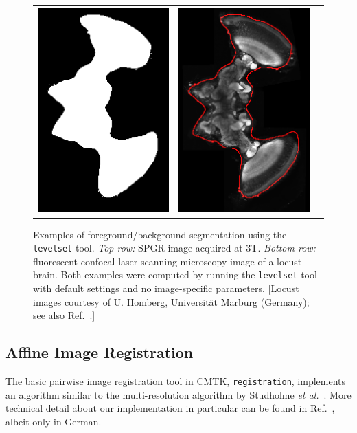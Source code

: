 \documentclass{InsightArticle}
\begin{document}
\begin{figure}[tb]
\begin{center}
\begin{tabular}{ccc}
\includegraphics[width=.3\linewidth]{img/levelset_locust_mask}&
\includegraphics[width=.3\linewidth]{img/levelset_locust_ovl}
\end{tabular}
\end{center}
\caption{Examples of foreground/background segmentation using the {\tt
levelset} tool. {\em Top row:\/} SPGR image acquired at 3T. {\em Bottom
row:\/} fluorescent confocal laser scanning microscopy image of a locust
brain. Both examples were computed by running the {\tt levelset} tool with
default settings and no image-specific parameters. [Locust images courtesy of
U. Homberg, Universit\"at Marburg (Germany); see also
Ref.~\cite{KuryRohlKrof:2008}.]  }
\label{fig:Levelset}
\end{figure}

\subsection{Affine Image Registration}

The basic pairwise image registration tool in CMTK, \verb|registration|,
implements an algorithm similar to the multi-resolution algorithm by Studholme
{\em et al.\/}~\cite{StudHillHawk:1997}. More technical detail about our
implementation in particular can be found in Ref.~\cite{Rohlfing:2000}, albeit
only in German.
\end{document}
